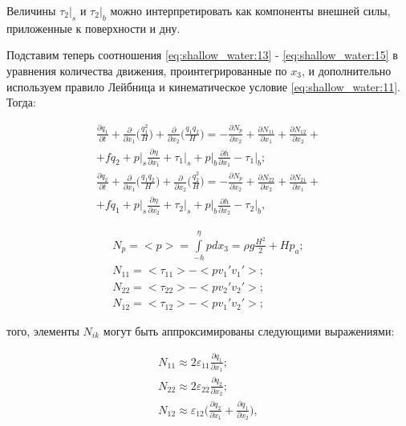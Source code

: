 \documentclass[14pt]{extreport}
\begin{document}
Величины $\tau_2|_s$ и $\tau_2|_b$ можно интерпретировать как компоненты внешней силы, приложенные к поверхности и дну.

Подставим теперь соотношения \eqref{eq:shallow_water:13} - \eqref{eq:shallow_water:15} в уравнения количества движения, проинтегрированные по $x_3$, и дополнительно используем правило Лейбница\cite{bib:calc:zorich} и кинематическое условие \eqref{eq:shallow_water:11}. Тогда:

\begin{equation}\label{eq:shallow_water:17}
\begin{aligned}
\frac{\partial q_1}{\partial t} + \frac{\partial}{\partial x_1} \bigg(\frac{q_1^2}{H}\bigg)+\frac{\partial }{\partial x_2}\bigg(\frac{q_1 q_2}{H}\bigg) = -\frac{\partial N_p}{\partial x_2} + \frac{\partial N_{11}}{\partial x_1} + \frac{\partial N_{12}}{\partial x_2} +\\+ fq_2 + p\bigg|_s \frac{\partial \eta}{\partial x_1} + \tau_1\bigg|_s+p\bigg|_b\frac{\partial h}{\partial x_1} - \tau_1\bigg|_b; \\
\frac{\partial q_2}{\partial t} + \frac{\partial}{\partial x_1} \bigg(\frac{q_1 q_2}{H}\bigg)+\frac{\partial }{\partial x_2}\bigg(\frac{q_2^2}{H}\bigg) = -\frac{\partial N_p}{\partial x_2} + \frac{\partial N_{22}}{\partial x_2} + \frac{\partial N_{21}}{\partial x_1} +\\+ fq_1 + p\bigg|_s \frac{\partial \eta}{\partial x_2} + \tau_2\bigg|_s+p\bigg|_b\frac{\partial h}{\partial x_2} - \tau_2\bigg|_b,
\end{aligned}
\end{equation}


\begin{equation}\label{eq:shallow_water:18}
\begin{aligned}
N_p = <p> = \int\limits^\eta_{-h} pdx_3=\rho g \frac{H^2}{2} + Hp_a; \\
N_{11} = <\tau_{11}>-<pv_1'v_1'>; \\
N_{22} = <\tau_{22}>-<pv_2'v_2'>; \\
N_{12} = <\tau_{12}>-<pv_1'v_2'>;
\end{aligned}
\end{equation}

 того, элементы $N_{ik}$ могут быть аппроксимированы следующими выражениями:

\begin{equation}\label{eq:shallow_water:19}
\begin{aligned}
N_{11} \approx 2 \varepsilon_{11}\frac{\partial q_1}{\partial x_1}; \\
N_{22} \approx 2 \varepsilon_{22}\frac{\partial q_2}{\partial x_2}; \\
N_{12} \approx \varepsilon_{12}\bigg(\frac{\partial q_2}{\partial x_1}+\frac{\partial q_1}{\partial x_2}\bigg),
\end{aligned}
\end{equation}
\end{document}
